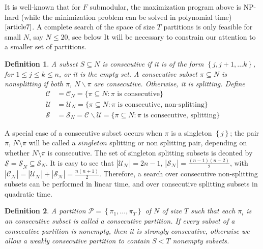\documentclass{article}
\newtheorem{definition}{Definition}
\theoremstyle{case}
\begin{document}
It is well-known that for $F$ submodular, the maximization program above is NP-hard (while the minimization problem can be solved in polynomial time) $\cite{article7}$. A complete search of the space of size $T$ partitions is only feasible for small $N$, say $N \leq 20$, see below It will be necessary to constrain our attention to a smaller set of partitions.

\begin{definition}
A subset $S \subseteq N$ is consecutive if it is of the form $\left\lbrace j, j+1, \dots k\right\rbrace$, for $1 \leq j \leq k \leq n$, or it is the empty set. A consecutive subset $\pi \subseteq N$ is nonsplitting if both $\pi$, $N  \backslash \pi$ are consecutive. Otherwise, it is splitting. Define
\begin{align*}
\mathcal{C} &= \mathcal{C}_N = \{ \pi \subseteq N : \pi \textrm{ is consecutive} \}\\
\mathcal{U} &= \mathcal{U}_N = \{ \pi \subseteq N : \pi \textrm{ is consecutive, non-splitting}\} \\
\mathcal{S} &= \mathcal{S}_N = \mathcal{C} \backslash \mathcal{U} = \{ \pi \subseteq N : \pi \textrm{ is consecutive, splitting} \}
\end{align*}
\end{definition}

A special case of a consecutive subset occurs when $\pi$ is a singleton $\left\lbrace j\right\rbrace$; the pair $\pi$, $N\setminus \pi$ will be called a $\textit{singleton}$ splitting or non splitting pair, depending on whether $N\setminus \pi$ is consecutive. The set of singleton splitting subsets is deonted by $\underline{\mathcal{S}} = \underline{\mathcal{S}}_N \subseteq \mathcal{S}_N$. It is easy to see that $| \mathcal{U_N} | = 2n - 1$, $| \mathcal{S_N} | = \frac{(n-1)(n-2)}{2}$, with $|\mathcal{C_N}| = |\mathcal{U_N}| + |\mathcal{S_N}| = \frac{n(n+1)}{2}$. Therefore, a search over consecutive non-splitting subsets can be performed in linear time, and over consecutive splitting subsets in quadratic time.

\begin{definition}
A partition $\mathcal{P} = \left\lbrace \pi_1, \dots, \pi_T\right\rbrace$ of $N$ of size $T$ such that each $\pi_i$ is an consecutive subset is called a consecutive partition. If every subset of a consecutive partition is nonempty, then it is strongly consecutive, otherwise we allow a weakly consecutive partition to contain $S < T$ nonempty subsets.
\end{definition}
\end{document}
